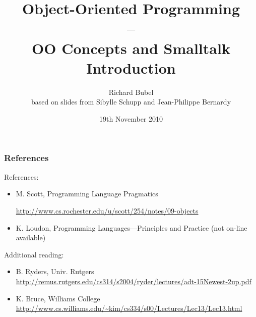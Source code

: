 \documentclass{beamer}
\title[OOP - OO Concepts and Smalltalk]{Object-Oriented
  Programming\\--\\OO Concepts and Smalltalk Introduction}
\subtitle{} %
\author[Richard Bubel] %
{Richard Bubel \\ based on slides from Sibylle Schupp and Jean-Philippe Bernardy}
\date{19th November 2010}%
\begin{document}
\begin{frame}
  \titlepage
\end{frame}

\begin{frame}[fragile]
\frametitle{References}
References:
\begin{itemize}
\item M. Scott, Programming Language Pragmatics

\url{http://www.cs.rochester.edu/u/scott/254/notes/09-objects}
\item K. Loudon, Programming Languages---Principles and Practice
(not on-line available)
\end{itemize}

Additional reading:
\begin{itemize}
\item B. Ryders, Univ. Rutgers
\url{
http://remus.rutgers.edu/cs314/s2004/ryder/lectures/adt-15Newest-2up.pdf
}
%
\item K. Bruce, Williams College
\url{
http://www.cs.williams.edu/~kim/cs334/s00/Lectures/Lec13/Lec13.html}
\end{itemize}
\end{frame}

\end{document}
